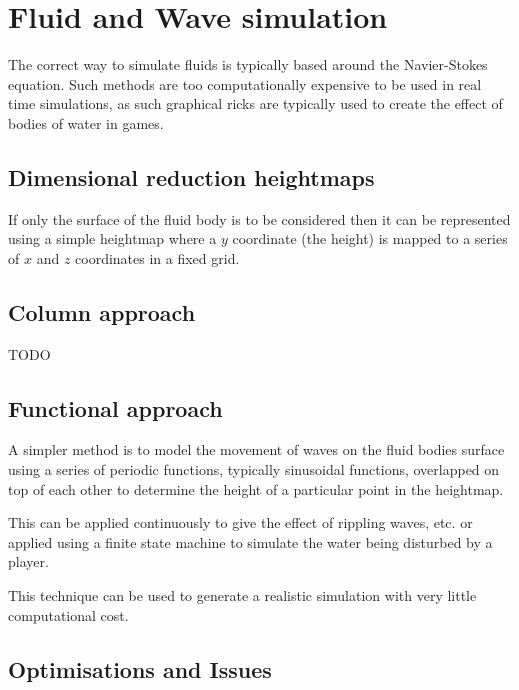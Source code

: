 \documentclass[a4paper]{article}
\begin{document}
\section{Fluid and Wave simulation}
\label{sec:fluid_dynamics}

The correct way to simulate fluids is typically based around the Navier-Stokes
equation. Such methods are too computationally expensive to be used in real time
simulations, as such graphical ricks are typically used to create the effect of
bodies of water in games.

\subsection{Dimensional reduction heightmaps}

If only the surface of the fluid body is to be considered then it can be
represented using a simple heightmap where a $y$ coordinate (the height) is
mapped to a series of $x$ and $z$ coordinates in a fixed grid.

\subsection{Column approach}

TODO

\subsection{Functional approach}

A simpler method is to model the movement of waves on the fluid bodies surface
using a series of periodic functions, typically sinusoidal functions, overlapped
on top of each other to determine the height of a particular point in the
heightmap.

This can be applied continuously to give the effect of rippling waves, etc. or
applied using a finite state machine to simulate the water being disturbed by a
player.

This technique can be used to generate a realistic simulation with very little
computational cost.

\subsection{Optimisations and Issues}
\end{document}
